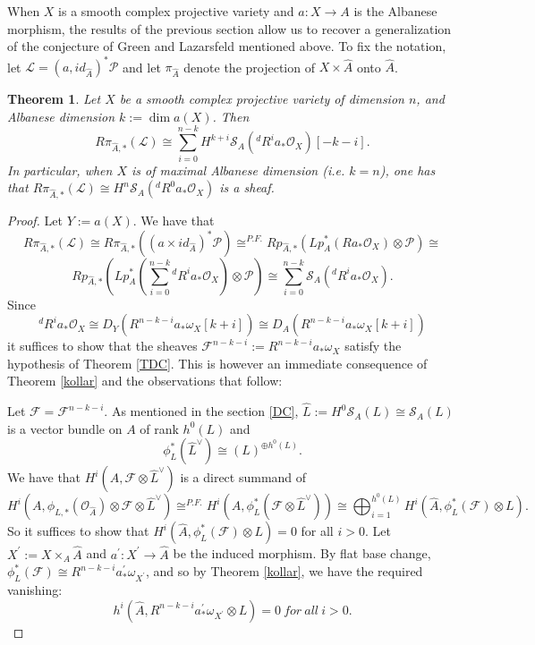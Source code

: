 \documentclass[10pt]{amsart}
\newtheorem{thm}{Theorem}[section]
\newcommand\alb{{ a}}
\newcommand\lra{\longrightarrow}
\newcommand\ot{{\otimes}}
\newcommand\OO{{\mathcal{O}}}
\newcommand\PP{{\mathcal{L}}}
\newcommand\LL{{\mathcal{P}}}
\newcommand\FF{{\mathcal{F}}}
\newcommand\s{{ {\mathcal S}}}
\begin{document}
 When $X$ is a smooth complex projective variety and $\alb :X\lra A$ is the
 Albanese morphism, the results of the previous section
allow us to recover a generalization of the conjecture of
 Green and Lazarsfeld mentioned above.
To fix the notation, let $\PP=(\alb ,id_{\hat{A}})^*\LL$ and 
let $\pi _{\hat A}$ denote
 the projection of $X\times \hat {A}$ onto $\hat{A}$.
 \begin{thm} \label{conjGL} \cite{Hac4}
 Let $X$ be a smooth complex projective variety of dimension 
 $n$, and Albanese dimension $k:=\dim \alb (X)$. 
 Then $$R \pi _{\hat {A },*}(\PP )\cong \sum _{i=0}^{n-k}H^{k+i}
 \s _A ({}^dR^i\alb _* \OO _X)[-k-i].$$
 In particular, when $X$ is of maximal Albanese dimension (i.e. $k=n$),
 one has that $R \pi _{\hat {A},*}(\PP )\cong 
H^n\s _A ({}^d R^0\alb_* \OO _X)$ is
 a sheaf.
 \end{thm}
\begin{proof} 
 Let $Y:=\alb (X)$. We have that
 $$R \pi _{\hat {A},*}(\PP )\cong R \pi _{\hat {A},*}
((\alb \times id_{\hat{A}})
^*
 \LL)\cong ^{P.F.}
 R p_{\hat {A},*}( L p_A^* (R \alb _* \OO _X)\ot \LL )\cong$$
 $$R p_{\hat {A},*}( L p_A^*
 (\sum _{i=0}^{n-k}{}^dR^i\alb _* \OO _X)\ot \LL)
 \cong 
 \sum _{i=0}^{n-k} \s _A ({}^dR^i\alb_* \OO _X).$$
 Since $${}^dR^i\alb _* \OO _X\cong D_Y(R^{n-k-i}\alb _* \omega _X[k+i])\cong
 D_A(R^{n-k-i}\alb _* \omega _X[k+i])$$
 it suffices to show that the sheaves $\FF ^{n-k-i}:= 
R^{n-k-i}\alb _* \omega _X
$
 satisfy the hypothesis of Theorem \ref{TDC}. 
 This is however an immediate consequence of Theorem \ref{kollar} and the  
observations that follow:

 Let $\FF =\FF ^{n-k-i}$. As mentioned in the section \ref{DC},
 $\hat {L}:=H^0\s _A(L)\cong  \s _A(L)$ is a vector bundle on $A$ of rank
 $h^0(L)$ and
 $$\phi _L^* \left( \hat{L}^\vee \right) \cong \left( L \right) 
^{\oplus h^0(L)}
.$$
 We have that 
 $H^i(A,\FF \ot \hat {L}^\vee )$ is a direct summand of 
 $$H^i(A,\phi _{L,*}(\OO _{\hat {A}})\ot \FF \ot \hat {L}^\vee  )
\cong ^{P.F.}H^
i(\hat {A},
 \phi _L^* (\FF \ot \hat {L}^\vee ))\cong \bigoplus _{i=1}
^{h^0(L)}H^i(\hat {A},
 \phi _L^* (\FF )\ot L ).$$ So it suffices to show that $H^i(\hat {A},
 \phi _L^* (\FF )\ot L )=0$ for all $i>0$.
 Let $X^\prime:=X\times _A \hat {A}$ and $\alb ^\prime:X^\prime
\lra \hat {A}$ be the induced morphism.
 By flat base change, $\phi _L^* (\FF )\cong R^{n-k-i}{\alb }^\prime_* \omega 
_{X^\prime}$, and so by
 Theorem \ref{kollar}, we have the required vanishing: $$h^i(\hat {A}, 
 R^{n-k-i}{\alb }^\prime_* \omega _{X^\prime}\ot L)=0\ for \ all\ i>0.$$

 \end{proof}
\end{document}
